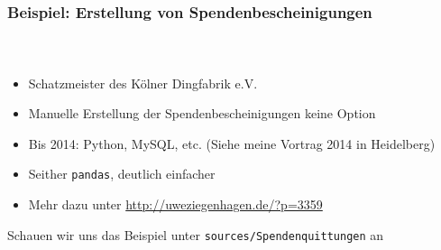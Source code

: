 \documentclass[12pt,ngerman]{beamer}
\begin{document}
\begin{frame}
\frametitle{Beispiel: Erstellung von Spendenbescheinigungen}
\framesubtitle{~}

\begin{itemize}
\item Schatzmeister des Kölner Dingfabrik e.V.
\item Manuelle Erstellung der Spendenbescheinigungen keine Option
\item Bis 2014: Python, MySQL, etc. (Siehe meine Vortrag 2014 in Heidelberg)
\item Seither \texttt{pandas}, deutlich einfacher
\item Mehr dazu unter \url{http://uweziegenhagen.de/?p=3359}
\end{itemize}

Schauen wir uns das Beispiel unter \texttt{sources/Spendenquittungen} an

\end{frame}
\end{document}

